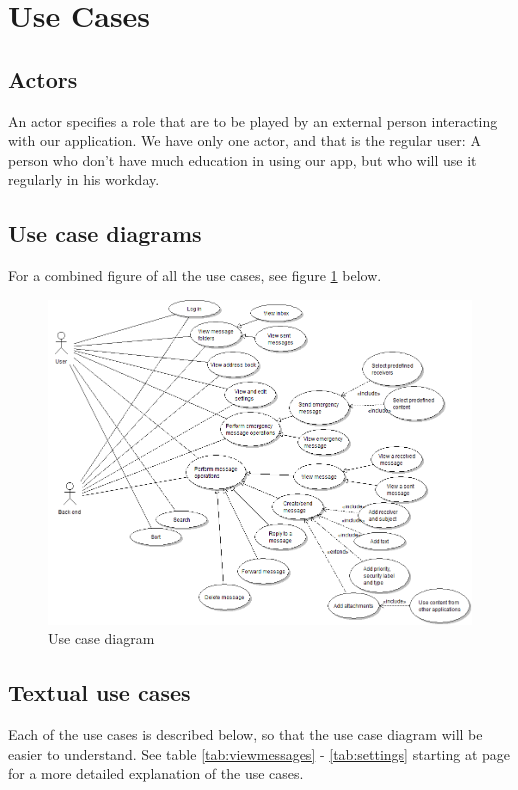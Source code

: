 \section{Use Cases}

\subsection{Actors}
An actor specifies a role that are to be played by an external person interacting with our application. We have only one actor, and that is the regular user: A person who don’t have much education in using our app, but who will use it regularly in his workday.

\subsection{Use case diagrams}
For a combined figure of all the use cases, see figure \ref{fig:usecase} below.

\begin{figure}[h!]
\begin{center}
\includegraphics[width=\textwidth]{kpro-use-case}
\caption{Use case diagram} \label{fig:usecase}
\end{center}
\end{figure}

\subsection{Textual use cases}
Each of the use cases is described below, so that the use case diagram will be easier to understand. See table \ref{tab:viewmessages} - \ref{tab:settings} starting at page \pageref{tab:viewmessages} for a more detailed explanation of the use cases.

